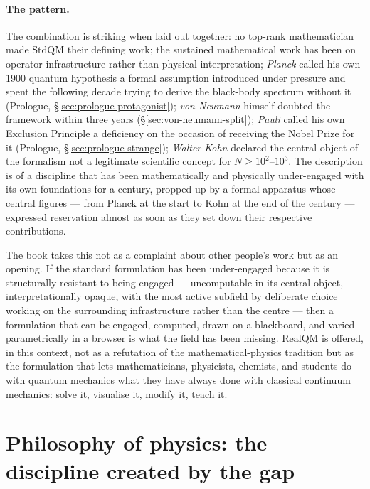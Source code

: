 \paragraph{The pattern.}
The combination is striking when laid out together: no top-rank mathematician made StdQM their defining work; the sustained mathematical work has been on operator infrastructure rather than physical interpretation; \emph{Planck} called his own 1900 quantum hypothesis a formal assumption introduced under pressure and spent the following decade trying to derive the black-body spectrum without it (Prologue, \S\ref{sec:prologue-protagonist}); \emph{von Neumann} himself doubted the framework within three years (\S\ref{sec:von-neumann-split}); \emph{Pauli} called his own Exclusion Principle a deficiency on the occasion of receiving the Nobel Prize for it (Prologue, \S\ref{sec:prologue-strange}); \emph{Walter Kohn} declared the central object of the formalism not a legitimate scientific concept for $N \geq 10^2$--$10^3$. The description is of a discipline that has been mathematically and physically under-engaged with its own foundations for a century, propped up by a formal apparatus whose central figures --- from Planck at the start to Kohn at the end of the century --- expressed reservation almost as soon as they set down their respective contributions.

The book takes this not as a complaint about other people's work but as an opening. If the standard formulation has been under-engaged because it is structurally resistant to being engaged --- uncomputable in its central object, interpretationally opaque, with the most active subfield by deliberate choice working on the surrounding infrastructure rather than the centre --- then a formulation that can be engaged, computed, drawn on a blackboard, and varied parametrically in a browser is what the field has been missing. RealQM is offered, in this context, not as a refutation of the mathematical-physics tradition but as the formulation that lets mathematicians, physicists, chemists, and students do with quantum mechanics what they have always done with classical continuum mechanics: solve it, visualise it, modify it, teach it.

\section{Philosophy of physics: the discipline created by the gap}\label{sec:philosophy-of-physics}

